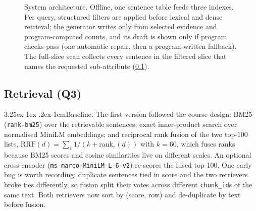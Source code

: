 \documentclass[10pt,twocolumn,a4paper]{article}
\makeatletter
\renewcommand\paragraph{\@startsection{paragraph}{4}{\parindent}%
  {3.25ex \@plus 1ex \@minus .2ex}{-1em}{\normalfont\normalsize\bfseries}}
\makeatother
\begin{document}
\begin{figure}[t]
\caption{System architecture. Offline, one sentence table feeds three indexes. Per query, structured filters are applied
before lexical and dense retrieval; the generator writes only from selected evidence and program-computed counts, and its
draft is shown only if program checks pass (one automatic repair, then a program-written fallback). The full-slice
scan collects every sentence in the filtered slice that names the requested sub-attribute (\cref{sec:ret}).}
\label{fig:arch}
\end{figure}

\subsection{Retrieval (Q3)}
\label{sec:ret}

\paragraph{Baseline.} The first version followed the course design: BM25 (\texttt{rank-bm25}) over the retrievable
sentences; exact inner-product search over normalised MiniLM embeddings; and reciprocal rank fusion of the two top-100
lists, $\mathrm{RRF}(d)=\sum_r 1/(k+\mathrm{rank}_r(d))$ with $k=60$, which fuses ranks because BM25 scores and cosine
similarities live on different scales. An optional cross-encoder (\nolinkurl{ms-marco-MiniLM-L-6-v2}) re-scores the
fused top-100. One early bug is worth recording: duplicate sentences tied in score and the two retrievers broke ties
differently, so fusion split their votes across different \nolinkurl{chunk_id}s of the same text. Both retrievers now
sort by (score, row) and de-duplicate by text before fusion.
\end{document}

